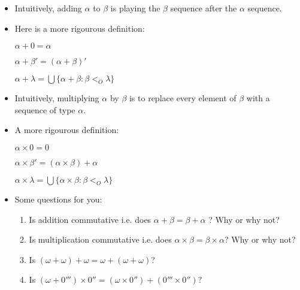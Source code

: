 \documentclass[justified]{tufte-handout}
\begin{document}
\begin{itemize}


\item Intuitively, adding $\alpha$ to $\beta$ is playing the $\beta$ sequence after the $\alpha$ sequence.


\item Here is a more rigourous definition: 

$\alpha + 0 = \alpha$

$\alpha + \beta'= (\alpha + \beta)'$

$\alpha + \lambda = \bigcup\{\alpha +\beta: \beta <_O \lambda\}$

\item Intuitively, multiplying  $\alpha$ by $\beta$ is to replace every element of $\beta$ with a sequence of type $\alpha$.

\item A more rigourous definition: 

$\alpha \times  0= 0$

$\alpha \times \beta'=(\alpha \times \beta) + \alpha$

$\alpha \times \lambda = \bigcup \{\alpha\times\beta: \beta<_O \lambda\}$





\item Some questions for you: 

\begin{enumerate}

\item Is addition commutative i.e. does $\alpha +\beta = \beta +\alpha$ ? Why or why not?


\item Is multiplication commutative i.e. does $\alpha\times\beta=\beta\times\alpha$? Why or why not? 

\item Is $(\omega + \omega) + \omega = \omega + (\omega + \omega)$?


\item Is $(\omega +0''')\times 0'' = (\omega \times 0'') + (0''' \times 0'')?$ 


\end{enumerate}


\end{itemize}
\end{document}
